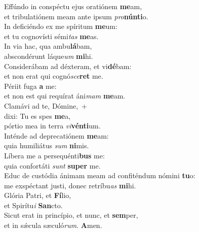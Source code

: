 \evenverse Effúndo in conspéctu ejus oratiónem \textbf{me}am,~\*\\
\evenverse et tribulatiónem meam ante ipsum \textit{pro}\textbf{nún}\textbf{ti}o.\\
\oddverse In deficiéndo ex me spíritum \textbf{me}um:~\*\\
\oddverse et tu cognovísti sémi\textit{tas} \textbf{me}as.\\
\evenverse In via hac, qua ambu\textbf{lá}bam,~\*\\
\evenverse abscondérunt láque\textit{um} \textbf{mi}hi.\\
\oddverse Considerábam ad déxteram, et vi\textbf{dé}bam:~\*\\
\oddverse et non erat qui cognó\textit{sce}\textbf{ret} me.\\
\evenverse Périit fuga \textbf{a} me:~\*\\
\evenverse et non est qui requírat áni\textit{mam} \textbf{me}am.\\
\oddverse Clamávi ad te, Dómine,~+\\
\oddverse  dixi: Tu es spes \textbf{me}a,~\*\\
\oddverse pórtio mea in terra \textit{vi}\textbf{vén}\textbf{ti}um.\\
\evenverse Inténde ad deprecatiónem \textbf{me}am:~\*\\
\evenverse quia humiliátus \textit{sum} \textbf{ni}mis.\\
\oddverse Líbera me a persequénti\textbf{bus} me:~\*\\
\oddverse quia confortáti \textit{sunt} \textbf{su}\textbf{per} me.\\
\evenverse Educ de custódia ánimam meam ad confiténdum nómini \textbf{tu}o:~\*\\
\evenverse me exspéctant justi, donec retríbu\textit{as} \textbf{mi}hi.\\
\oddverse Glória Patri, et \textbf{Fí}lio,~\*\\
\oddverse et Spirítu\textit{i} \textbf{San}cto.\\
\evenverse Sicut erat in princípio, et nunc, et \textbf{sem}per,~\*\\
\evenverse et in sǽcula sæculó\textit{rum}. \textbf{A}men.\\
